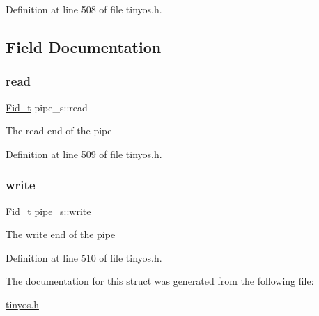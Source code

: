 Definition at line 508 of file tinyos.\+h.



\subsection{Field Documentation}
\mbox{\label{structpipe__s_ad0839b4f9b1fdb0241411952203f18aa}} 
\subsubsection{\texorpdfstring{read}{read}}
{\footnotesize\ttfamily \hyperlink{group__syscalls_ga5097222c5f0da97d92d4712359abc38f}{Fid\+\_\+t} pipe\+\_\+s\+::read}

The read end of the pipe 

Definition at line 509 of file tinyos.\+h.

\mbox{\label{structpipe__s_a69acc9cdf5f10195c43491e3ffa98cb1}} 
\subsubsection{\texorpdfstring{write}{write}}
{\footnotesize\ttfamily \hyperlink{group__syscalls_ga5097222c5f0da97d92d4712359abc38f}{Fid\+\_\+t} pipe\+\_\+s\+::write}

The write end of the pipe 

Definition at line 510 of file tinyos.\+h.



The documentation for this struct was generated from the following file\+:\begin{DoxyCompactItemize}
\item 
\hyperlink{tinyos_8h}{tinyos.\+h}\end{DoxyCompactItemize}
